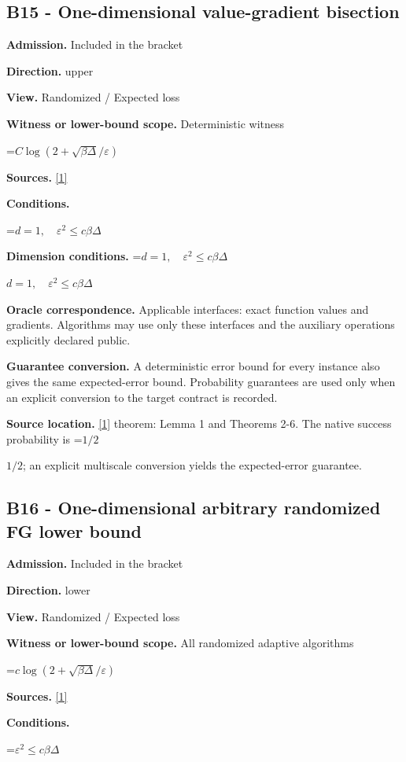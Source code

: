 \documentclass[10pt,a4paper]{article}
\newcommand{\AtlasMath}[1]{\par\begingroup\centering\setbox0=\hbox{$\displaystyle #1$}\ifdim\wd0>1.4\linewidth\typeout{ATLAS WIDE FORMULA: \the\wd0}\fi\ifdim\wd0>\linewidth\resizebox{\linewidth}{!}{\box0}\else\box0\fi\par\endgroup}
\newcommand{\AtlasInlineMath}[1]{\begingroup\setbox0=\hbox{$#1$}\ifdim\wd0>.4\linewidth\endgroup\AtlasMath{#1}\else\endgroup$#1$\fi}
\begin{document}
\subsection{B15 - One-dimensional value-gradient bisection}
\textbf{Admission.} Included in the bracket

\textbf{Direction.} upper

\textbf{View.} Randomized / Expected loss

\textbf{Witness or lower-bound scope.} Deterministic witness

\AtlasMath{C\log(2+\sqrt{\beta\Delta}/\varepsilon)}
\textbf{Sources.} \href{https://arxiv.org/pdf/2209.07513}{[1]}

\textbf{Conditions.} 
\AtlasMath{d=1,\quad\varepsilon^2\le c\beta\Delta}


\textbf{Dimension conditions.} \AtlasInlineMath{d=1,\quad\varepsilon^2\le c\beta\Delta}

\textbf{Oracle correspondence.} Applicable interfaces: exact function values and gradients. Algorithms may use only these interfaces and the auxiliary operations explicitly declared public.

\textbf{Guarantee conversion.} A deterministic error bound for every instance also gives the same expected-error bound. Probability guarantees are used only when an explicit conversion to the target contract is recorded.

\textbf{Source location.} \href{https://arxiv.org/pdf/2209.07513}{[1]} theorem: Lemma 1 and Theorems 2-6. The native success probability is \AtlasInlineMath{1/2}; an explicit multiscale conversion yields the expected-error guarantee.

\subsection{B16 - One-dimensional arbitrary randomized FG lower bound}
\textbf{Admission.} Included in the bracket

\textbf{Direction.} lower

\textbf{View.} Randomized / Expected loss

\textbf{Witness or lower-bound scope.} All randomized adaptive algorithms

\AtlasMath{c\log(2+\sqrt{\beta\Delta}/\varepsilon)}
\textbf{Sources.} \href{https://arxiv.org/pdf/2209.07513}{[1]}

\textbf{Conditions.} 
\AtlasMath{\varepsilon^2\le c\beta\Delta}
\end{document}
